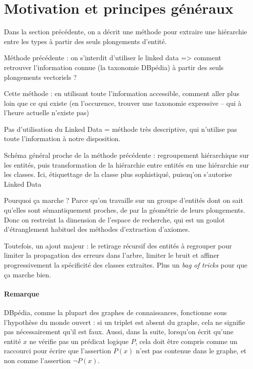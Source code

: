 \label{chap:texp}

\section{Motivation et principes généraux}

Dans la section précédente, on a décrit une méthode pour extraire une hiérarchie entre les types à partir des seuls plongements d'entité. 

Méthode précédente : on s'interdit d'utiliser le linked data => comment retrouver l'information connue (la taxonomie DBpédia) à partir des seuls plongements vectoriels ?

Cette méthode : en utilisant toute l'information accessible, comment aller plus loin que ce qui existe (en l'occurence, trouver une taxonomie expressive – qui à l'heure actuelle n'existe pas)

Pas d'utilisation du Linked Data = méthode très descriptive, qui n'utilise pas toute l'information à notre disposition.

Schéma général proche de la méthode précédente : regroupement hiérarchique sur les entités, puis transformation de la hiérarchie entre entités en une hiérarchie sur les classes. Ici, étiquettage de la classe plus sophistiqué, puisuq'on s'autorise Linked Data

Pourquoi ça marche ? Parce qu'on travaille sur un groupe d'entités dont on sait qu'elles sont sémantiquement proches, de par la géométrie de leurs plongements. Donc on restreint la dimension de l'espace de recherche, qui est un goulot d'étranglement habituel des méthodes d'extraction d'axiomes.

Toutefois, un ajout majeur : le retirage récursif des entités à regrouper pour limiter la propagation des erreurs dans l'arbre, limiter le bruit et affiner progressivement la spécificité des classes extraites. Plus un \textit{bag of tricks} pour que ça marche bien.

\paragraph{Remarque}

DBpédia, comme la plupart des graphes de connaissances, fonctionne sous l'hypothèse du monde ouvert : si un triplet est absent du graphe, cela ne signifie pas nécessairement qu'il est faux. Aussi, dans la suite, lorsqu'on écrit qu'une entité $x$ ne vérifie pas un prédicat logique $P$, cela doit être compris comme un raccourci pour écrire que l'assertion $P(x)$ n'est pas contenue dans le graphe, et non comme l'assertion $\neg P(x)$.

